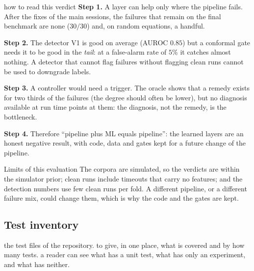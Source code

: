 \begin{explained}{how to read this verdict}
\textbf{Step 1.} A layer can help only where the pipeline fails. After the fixes of the main sessions, the failures that remain on the final benchmark are none ($30/30$) and, on random equations, a handful.

\medskip\textbf{Step 2.} The detector V1 is good on average (AUROC $0.85$) but a conformal gate needs it to be good in the \emph{tail}: at a false-alarm rate of $5\%$ it catches almost nothing. A detector that cannot flag failures without flagging clean runs cannot be used to downgrade labels.

\medskip\textbf{Step 3.} A controller would need a trigger. The oracle shows that a remedy exists for two thirds of the failures (the degree should often be lower), but no diagnosis available at run time points at them: the diagnosis, not the remedy, is the bottleneck.

\medskip\textbf{Step 4.} Therefore ``pipeline plus ML equals pipeline'': the learned layers are an honest negative result, with code, data and gates kept for a future change of the pipeline.
\end{explained}

\begin{capbox}{Limits of this evaluation}
The corpora are simulated, so the verdicts are within the simulator prior; clean runs include timeouts that carry no features; and the detection numbers use few clean runs per fold. A different pipeline, or a different failure mix, could change them, which is why the code and the gates are kept.
\end{capbox}

\subsection{Test inventory}\label{sec:tests}
\sectionbrief
{the test files of the repository.}
{to give, in one place, what is covered and by how many tests.}
{a reader can see what has a unit test, what has only an experiment, and what has neither.}

